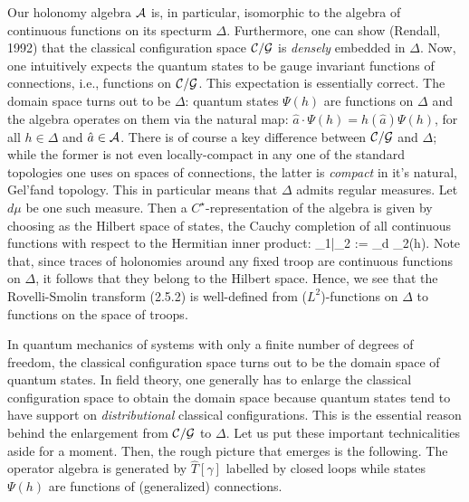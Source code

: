 Our holonomy algebra ${\cal A}$ is, in particular, isomorphic to the
algebra of continuous functions on its specturm $\Delta$. Furthermore, one
can show (Rendall, 1992) that the classical configuration space ${\cal C}/
{\cal G}$ is {\it densely} embedded in $\Delta$. Now, one intuitively expects
the quantum states to be gauge invariant functions of connections, i.e.,
functions on ${\cal C}/{\cal G}$. This expectation is essentially correct.
The domain space turns out to be $\Delta$: quantum states $\Psi(h)$ are
functions on $\Delta$ and the algebra operates on them via the natural
map: $\hat{a}\cdot\Psi(h) = h(\hat{a})\Psi(h)$, for all $h\in \Delta$ and
$\hat{a}\in {\cal A}$. There is of course a key difference between ${\cal C}
/{\cal G}$ and $\Delta$; while the former is not even locally-compact
in any one of the standard topologies one uses on spaces of connections, the
latter is {\it compact} in it's natural, Gel'fand topology. This in particular
means that $\Delta$ admits regular measures. Let $d\mu$ be one such measure.
Then a $C^\star$-representation of the algebra is given by choosing as the
Hilbert space of states, the Cauchy completion of all continuous functions
with respect to the Hermitian inner product:
\bneq
\langle \Psi_1|\Psi_2 \rangle := \lint_\Delta d\mu \- \-
\Psi_2(h).
Note that, since traces of holonomies around any fixed troop are continuous
functions on $\Delta$, it follows that they belong to the Hilbert space.
Hence, we see that the Rovelli-Smolin transform (2.5.2) is well-defined
from ($L^2$)-functions on $\Delta$ to functions on the space of troops.

In quantum mechanics of systems with only a finite number of degrees of
freedom, the classical configuration space turns out to be the domain
space of quantum states. In field theory, one generally has to enlarge the
classical configuration space to obtain the domain space because quantum
states tend to have support on {\it distributional} classical configurations.
This is the essential reason behind the enlargement from ${\cal C}/{\cal G}$
to $\Delta$. Let us put these important technicalities aside for a moment.
Then, the rough picture that emerges is the following. The operator
algebra is generated by $\hat{T}[\gamma]$ labelled by closed loops while
states $\Psi(h)$ are functions of (generalized) connections.

